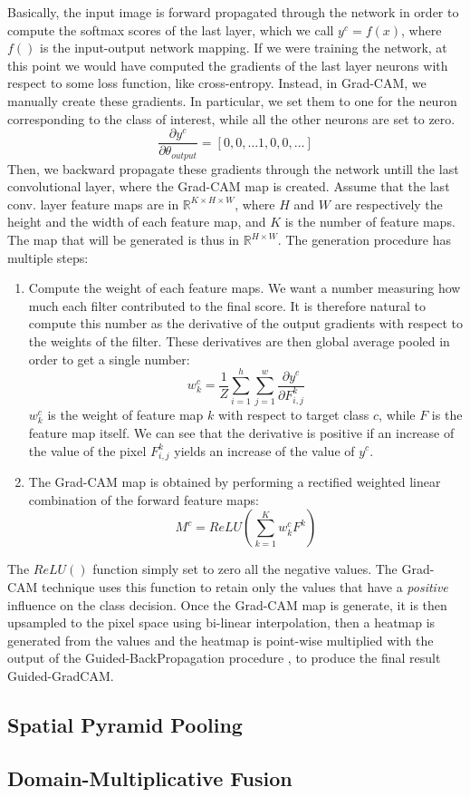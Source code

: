 \documentclass[../main.tex]{subfiles}
\begin{document}
    Basically, the input image is forward propagated through the network in order to compute the softmax scores
    of the last layer, which we call $y^{c} = f(x)$, where $f()$ is the input-output network mapping.
    If we were training the network, at this point we would have computed the gradients of the
    last layer neurons with respect to some loss function, like cross-entropy. Instead, in Grad-CAM, we manually
    create these gradients. In particular, we set them to one for the neuron corresponding to the class of interest,
    while all the other neurons are set to zero.
    $$ \frac{\partial y^{c}}{\partial \theta_{output}} = [0, 0, \ldots 1, 0, 0, \ldots] $$
    Then, we backward propagate these gradients through the network untill
    the last convolutional layer, where the Grad-CAM map is created. Assume that the last conv. layer feature maps are
    in $ \mathbb{R}^{K \times H \times W} $, where $H$ and $W$ are respectively the height and the width of each feature
    map, and $K$ is the number of feature maps. The map that will be generated is thus in $\mathbb{R}^{H \times W}$.
    The generation procedure has multiple steps:
    \begin{enumerate}
        \item Compute the weight of each feature maps. We want a number measuring how much each filter contributed to
            the final score. It is therefore natural to compute this number as the derivative of the output gradients
            with respect to the weights of the filter. These derivatives are then global average pooled in order to get
            a single number:
            \begin{equation}
                w_{k}^{c} = \frac{1}{Z} \sum_{i = 1}^{h} \sum_{j = 1}^{w} \frac{\partial y^{c}}{\partial F_{i, j}^{k}}
            \end{equation}
            $w_{k}^{c}$ is the weight of feature map $k$ with respect to target class $c$, while $F$ is the feature map
            itself. We can see that the derivative is positive if an increase of the value of the pixel $F_{i, j}^{k}$ yields
            an increase of the value of $y^{c}$.
        \item The Grad-CAM map is obtained by performing a rectified weighted linear combination of the forward feature maps:
            \begin{equation}
                M^{c} = ReLU \left( \sum_{k = 1}^{K} w_{k}^{c} F^{k} \right)
            \end{equation}
    \end{enumerate}
    The $ReLU()$ function simply set to zero all the negative values. The Grad-CAM technique uses this function to retain only
    the values that have a \textit{positive} influence on the class decision.
    Once the Grad-CAM map is generate, it is then upsampled to the pixel space using bi-linear interpolation, then a heatmap
    is generated from the values and the heatmap is point-wise multiplied with the output of the Guided-BackPropagation procedure
	\cite{guidedbackprop}, to produce the final result Guided-GradCAM.

    \subsection{Spatial Pyramid Pooling}

    \subsection{Domain-Multiplicative Fusion}
\end{document}
